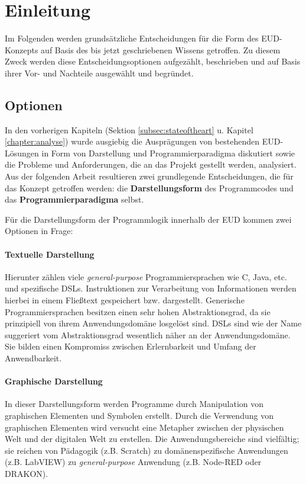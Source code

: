 \section{Einleitung}\label{sec:einleitungkonzept}
Im Folgenden werden grundsätzliche Entscheidungen für die Form des \ac{EUD}-Kon\-zepts auf Basis des bis jetzt geschriebenen Wissens getroffen. Zu diesem Zweck werden diese Entscheidungsoptionen aufgezählt, beschrieben und auf Basis ihrer Vor- und Nachteile ausgewählt und begründet.

\subsection{Optionen}\label{subsec:optionen}
In den vorherigen Kapiteln (Sektion \ref{subsec:stateoftheart} u. Kapitel \ref{chapter:analyse}) wurde ausgiebig die Ausprägungen von bestehenden \ac{EUD}-Lösungen in Form von Darstellung und Programmierparadigma diskutiert sowie die Probleme und Anforderungen, die an das Projekt gestellt werden, analysiert. Aus der folgenden Arbeit resultieren zwei grundlegende Entscheidungen, die für das Konzept getroffen werden: die \textbf{Darstellungsform} des Programmcodes und das \textbf{Programmierparadigma} selbst. 

Für die Darstellungsform der Programmlogik innerhalb der \ac{EUD} kommen zwei Optionen in Frage:
\paragraph{Textuelle Darstellung} Hierunter zählen viele \textit{general-purpose} Programmiersprachen wie C, Java, etc. und spezifische \acp{DSL}. Instruktionen zur Verarbeitung von Informationen werden hierbei in einem Fließtext gespeichert bzw. dargestellt. Generische Programmiersprachen besitzen einen sehr hohen Abstraktionsgrad, da sie prinzipiell von ihrem Anwendungsdomäne losgelöst sind. \acp{DSL} sind wie der Name suggeriert vom Abstraktionsgrad wesentlich näher an der Anwendungsdomäne. Sie bilden einen Kompromiss zwischen Erlernbarkeit und Umfang der Anwendbarkeit.

\paragraph{Graphische Darstellung} In dieser Darstellungsform werden Programme durch Manipulation von graphischen Elementen und Symbolen erstellt. Durch die Verwendung von graphischen Elementen wird versucht eine Metapher zwischen der physischen Welt und der digitalen Welt zu erstellen. Die Anwendungsbereiche sind vielfältig; sie reichen von Pädagogik (z.B. Scratch) zu domänenspezifische Anwendungen (z.B. LabVIEW) zu \textit{general-purpose} Anwendung (z.B. Node-RED oder DRAKON). 

